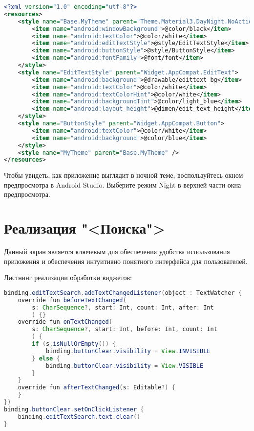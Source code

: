 \begin{lstlisting}[language=XML]
<?xml version="1.0" encoding="utf-8"?>
<resources>
    <style name="Base.MyTheme" parent="Theme.Material3.DayNight.NoActionBar">
        <item name="android:windowBackground">@color/black</item>
        <item name="android:textColor">@color/white</item>
        <item name="android:editTextStyle">@style/EditTextStyle</item>
        <item name="android:buttonStyle">@style/ButtonStyle</item>
        <item name="android:fontFamily">@font/font</item>
    </style>
    <style name="EditTextStyle" parent="Widget.AppCompat.EditText">
        <item name="android:background">@drawable/edittext_bg</item>
        <item name="android:textColor">@color/white</item>
        <item name="android:textColorHint">@color/white</item>
        <item name="android:backgroundTint">@color/light_blue</item>
        <item name="android:layout_height">@dimen/edit_text_height</item>
    </style>
    <style name="ButtonStyle" parent="Widget.AppCompat.Button">
        <item name="android:textColor">@color/white</item>
        <item name="android:background">@color/blue</item>
    </style>
    <style name="MyTheme" parent="Base.MyTheme" />
</resources>
\end{lstlisting}

Чтобы увидеть, как приложение выглядит в ночной теме,
воспользуйтесь окном предпросмотра в Android Studio.
Выберите режим Night в верхней части окна предпросмотра.

\section{Реализация "<Поиска">}

Данный экран является ключевым для обеспечения удобства использования
приложения и обеспечения интуитивно понятного интерфейса для пользователей.

Листнинг реализации обработки виджетов:

\begin{lstlisting}[language=Java]
binding.editTextSearch.addTextChangedListener(object : TextWatcher {
	override fun beforeTextChanged(
		s: CharSequence?, start: Int, count: Int, after: Int
		) {}
	override fun onTextChanged(
		s: CharSequence?, start: Int, before: Int, count: Int
		) {
		if (s.isNullOrEmpty()) {
			binding.buttonClear.visibility = View.INVISIBLE
		} else {
			binding.buttonClear.visibility = View.VISIBLE
		}
	}
	override fun afterTextChanged(s: Editable?) {
	}
})
binding.buttonClear.setOnClickListener {
	binding.editTextSearch.text.clear()
}
\end{lstlisting}

